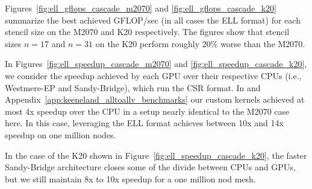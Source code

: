 \documentclass{report}
\begin{document}
Figures~\ref{fig:ell_gflops_cascade_m2070} and \ref{fig:ell_gflops_cascade_k20} summarize the best achieved GFLOP/sec (in all cases the ELL format) for each stencil size on the M2070 and K20 respectively. The figures show that stencil sizes $n=17$ and $n=31$ on the K20 perform roughly 20\% worse than the M2070. 

In Figures~\ref{fig:ell_speedup_cascade_m2070} and \ref{fig:ell_speedup_cascade_k20}, we consider the speedup achieved by each GPU over their respective CPUs  (i.e., Westmere-EP and Sandy-Bridge), which run the  CSR format. In \cite{BolligFlyerErlebacher2012} and Appendix~\ref{app:keeneland_alltoallv_benchmarks} our custom kernels achieved at most 4x speedup over the CPU in a setup nearly identical to the M2070 case here. In this case, leveraging the ELL format achieves between 10x and 14x speedup on one million nodes. 

In the case of the K20 shown in Figure~\ref{fig:ell_speedup_cascade_k20}, the faster Sandy-Bridge architecture closes some of the divide between CPUs and GPUs, but we still maintain 8x to 10x speedup for a one million nod mesh.
\end{document}
